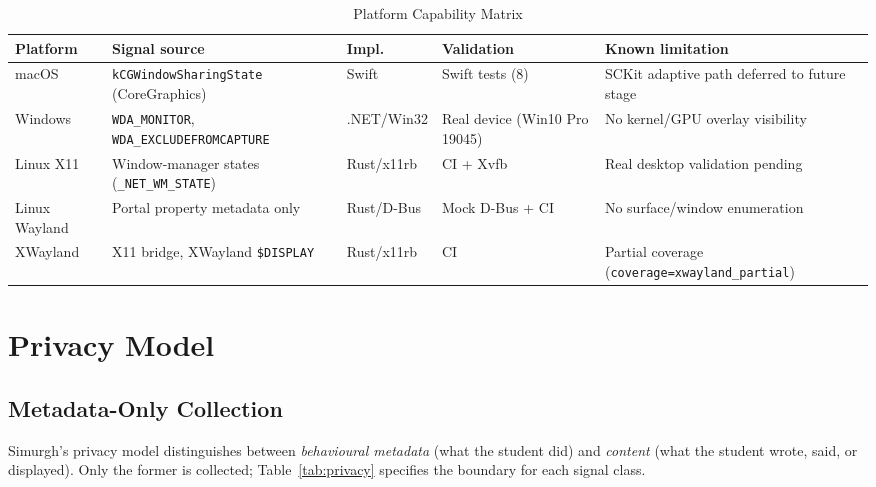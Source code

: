 \documentclass[conference]{IEEEtran}
\begin{document}
\begin{table}[t]
\centering
\scriptsize
\caption{Platform Capability Matrix}
\label{tab:platform}
\begin{tabularx}{\textwidth}{@{}lXllX@{}}
\toprule
\textbf{Platform} & \textbf{Signal source} & \textbf{Impl.} & \textbf{Validation} & \textbf{Known limitation} \\
\midrule
macOS & \texttt{kCGWindowSharingState} (CoreGraphics) & Swift & Swift tests (8) & SCKit adaptive path deferred to future stage \\
Windows & \texttt{WDA\_MONITOR}, \texttt{WDA\_EXCLUDEFROMCAPTURE} & .NET/Win32 & Real device (Win10 Pro 19045) & No kernel/GPU overlay visibility \\
Linux X11 & Window-manager states (\texttt{\_NET\_WM\_STATE}) & Rust/x11rb & CI + Xvfb & Real desktop validation pending \\
Linux Wayland & Portal property metadata only & Rust/D-Bus & Mock D-Bus + CI & No surface/window enumeration \\
XWayland & X11 bridge, XWayland \texttt{\$DISPLAY} & Rust/x11rb & CI & Partial coverage (\texttt{coverage=xwayland\_partial}) \\
\bottomrule
\end{tabularx}
\end{table}

\section{Privacy Model}

\subsection{Metadata-Only Collection}

Simurgh's privacy model distinguishes between \textit{behavioural metadata} (what the student did) and \textit{content} (what the student wrote, said, or displayed). Only the former is collected; Table~\ref{tab:privacy} specifies the boundary for each signal class.
\end{document}
